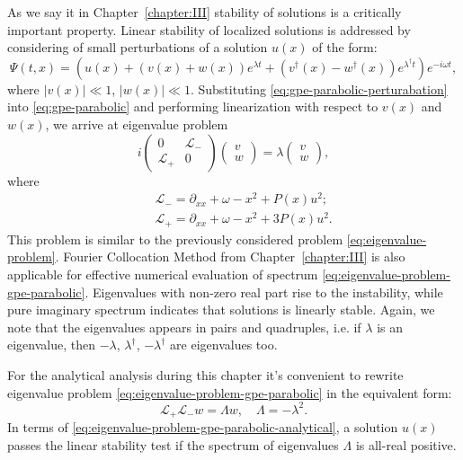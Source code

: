 As we say it in Chapter~\ref{chapter:III} stability of solutions is a critically important property.
Linear stability of localized solutions is addressed by considering of small perturbations of a solution $u(x)$ of the form:
\begin{equation}
	\Psi(t, x) = \left( u(x) + (v(x) + w(x)) e^{\lambda t} + (v^{\dagger}(x) - w^{\dagger}(x)) e^{\lambda^{\dagger} t} \right) e^{-i \omega t},
\label{eq:gpe-parabolic-perturabation}
\end{equation}
where $|v(x)| \ll 1$, $|w(x)| \ll 1$.
Substituting \eqref{eq:gpe-parabolic-perturabation} into \eqref{eq:gpe-parabolic} and performing linearization with respect to $v(x)$ and $w(x)$, we arrive at eigenvalue problem
\begin{equation}
	i
	\begin{pmatrix}
		0 & \mathcal{L}_- \\
		\mathcal{L}_+ & 0
	\end{pmatrix}
	\begin{pmatrix}
		v \\ w
	\end{pmatrix} =
	\lambda
	\begin{pmatrix}
		v \\ w	
	\end{pmatrix},
\label{eq:eigenvalue-problem-gpe-parabolic}
\end{equation}
where 
\begin{eqnarray*}
	&& \mathcal{L}_- = \partial_{xx} + \omega -x^2 + P(x) u^2; \\
	&& \mathcal{L}_+ = \partial_{xx} + \omega -x^2 + 3 P(x) u^2.
\end{eqnarray*}
This problem is similar to the previously considered problem \eqref{eq:eigenvalue-problem}.
Fourier Collocation Method from Chapter~\ref{chapter:III} is also applicable for effective numerical evaluation of spectrum \eqref{eq:eigenvalue-problem-gpe-parabolic}.
Eigenvalues with non-zero real part rise to the instability, while pure imaginary spectrum indicates that solutions is linearly stable.
Again, we note that the eigenvalues appears in pairs and quadruples, i.e. if $\lambda$ is an eigenvalue, then $-\lambda$, $\lambda^{\dagger}$, $-\lambda^{\dagger}$ are eigenvalues too.

For the analytical analysis during this chapter it's convenient to rewrite eigenvalue problem \eqref{eq:eigenvalue-problem-gpe-parabolic} in the equivalent form:
\begin{equation}
	\mathcal{L}_+ \mathcal{L}_- w = \Lambda w, \quad \Lambda = -\lambda^2.
\label{eq:eigenvalue-problem-gpe-parabolic-analytical}
\end{equation}
In terms of \eqref{eq:eigenvalue-problem-gpe-parabolic-analytical}, a solution $u(x)$ passes the linear stability test if the spectrum of eigenvalues $\Lambda$ is all-real positive.

